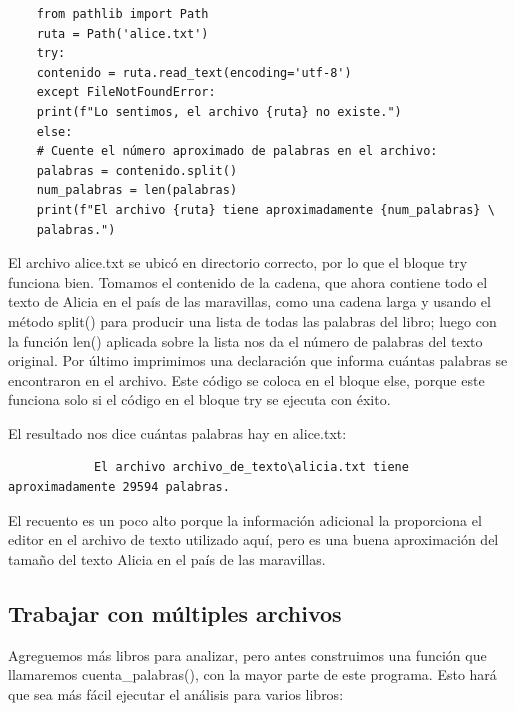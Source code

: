 \begin{lstlisting}
	from pathlib import Path
	ruta = Path('alice.txt')
	try:
	contenido = ruta.read_text(encoding='utf-8')
	except FileNotFoundError:
	print(f"Lo sentimos, el archivo {ruta} no existe.") 
	else:
	# Cuente el número aproximado de palabras en el archivo:
	palabras = contenido.split()
	num_palabras = len(palabras)
	print(f"El archivo {ruta} tiene aproximadamente {num_palabras} \
	palabras.")
\end{lstlisting}


El archivo {\ttfamily alice.txt} se ubicó en  directorio correcto, por lo que el bloque {\ttfamily try}
funciona bien. Tomamos el contenido de la cadena, que ahora contiene todo el
texto de Alicia en el país de las maravillas, como una cadena larga y usando el método  {\ttfamily split()} para producir una
lista de todas las palabras del libro; luego con la función  {\ttfamily len()} aplicada sobre la lista nos da el número de palabras del texto original. Por último imprimimos una declaración que informa cuántas palabras se encontraron en el archivo. 
Este código se coloca en el bloque {\ttfamily else}, porque este  funciona solo si el código en el bloque {\ttfamily try} se ejecuta con éxito.

El resultado nos dice cuántas palabras hay en {\ttfamily alice.txt}:

{\ttfamily\scriptsize\scriptsize 
	{\color{blue} 	
		\begin{verbatim}
			El archivo archivo_de_texto\alicia.txt tiene aproximadamente 29594 palabras.
		\end{verbatim}
}}


El recuento es un poco alto porque la información adicional la proporciona el
editor en el archivo de texto utilizado aquí, pero es una buena aproximación del tamaño del texto  
Alicia en el país de las maravillas.

\subsection{Trabajar con múltiples archivos} 

Agreguemos más libros para analizar, pero antes construimos una función que llamaremos {\ttfamily cuenta\_palabras()}, con la mayor parte de
este programa. Esto hará que sea más fácil ejecutar el análisis para varios libros:

\hspace{-2.5cm}{\ttfamily \scriptsize cuenta\_}

